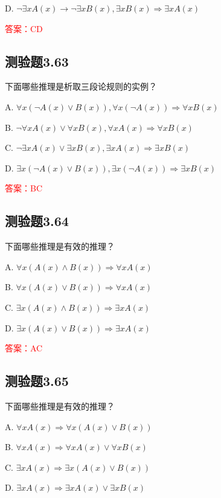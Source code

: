 \documentclass[UTF8, heading=true]{ctexart}
\begin{document}
D. $\neg \exists x A(x) \rightarrow \neg \exists x B(x),  \exists x B(x) \Longrightarrow \exists x A(x)$

\textcolor{red}{答案：CD}

\subsection{测验题3.63}

下面哪些推理是析取三段论规则的实例？

A. $\forall x(\neg A(x) \vee B(x)),  \forall x(\neg A(x)) \Longrightarrow \forall x B(x)$

B. $\neg \forall x A(x) \vee \forall x B(x),  \forall x A(x) \Longrightarrow \forall x B(x)$

C. $\neg \exists x A(x) \vee \exists x B(x), \exists x A(x) \Longrightarrow \exists x B(x)$

D. ${\exists x}(\neg A(x) \vee B(x)),  \exists x(\neg A(x)) \Longrightarrow \exists x B(x)$


\textcolor{red}{答案：BC}

\subsection{测验题3.64}

下面哪些推理是有效的推理？

A. $\forall x(A(x) \wedge B(x)) \Longrightarrow \forall x A(x)$

B. $\forall x(A(x) \vee B(x)) \Longrightarrow \forall x A(x)$

C. $\exists x(A(x) \wedge B(x)) \Longrightarrow \exists x A(x)$

D. $\exists x(A(x) \vee B(x)) \Longrightarrow \exists x A(x)$

\textcolor{red}{答案：AC}

\subsection{测验题3.65}

下面哪些推理是有效的推理？

A. $
\forall x A(x) \Longrightarrow \forall x(A(x) \vee B(x))
$

B. $
\forall x A(x) \Longrightarrow \forall x A(x) \vee \forall x B(x)
$

C. $
\exists x A(x) \Longrightarrow \exists x(A(x) \vee B(x))
$

D. $
\exists x A(x) \Longrightarrow \exists x A(x) \vee \exists x B(x)
$
\end{document}
